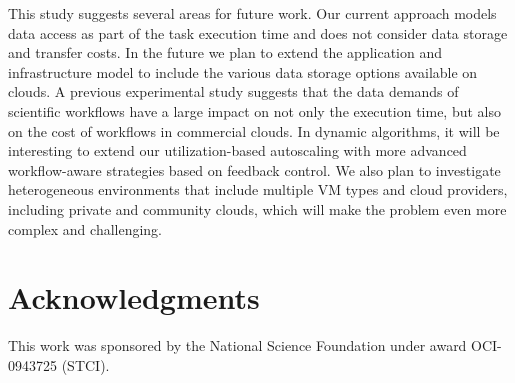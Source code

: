 \documentclass[conference]{IEEEtran}
\begin{document}

This study suggests several areas for future work. Our current approach models
data access as part of the task execution time and does not consider data
storage and transfer costs. In the future we plan to extend the application
and infrastructure model to  include the various data storage options
available on clouds. A previous experimental study \cite{Juve2010} suggests
that the data demands of scientific workflows have a large impact on not only
the execution time, but also on the cost of workflows in commercial clouds. 
In dynamic algorithms, it will be interesting to extend our
utilization-based autoscaling with more advanced workflow-aware strategies
based on feedback control.
We also plan to investigate heterogeneous environments that include multiple VM
types and cloud providers, including private and community clouds, which will
make the problem even more complex and challenging.




\section*{Acknowledgments}
This work was sponsored by the National Science Foundation under award 
OCI-0943725 (STCI).


%







\end{document}
